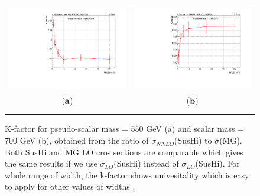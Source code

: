 \begin{figure}[h]
\centering
\begin{tabular}{cc}
\hspace{-0.5cm}
\includegraphics[scale=0.4]{fig/chapt4/k_factor_PScalar_m550_res.pdf}
& \hspace{-0.95cm} \includegraphics[scale=0.4]{fig/chapt4/k_factor_Scalar_m700_res.pdf}\\
($\mathbf{a}$)\qquad\qquad&($\mathbf{b}$)\qquad\qquad\\ \\
\caption{K-factor for pseudo-scalar mass = 550 GeV (a) and scalar mass = 700 GeV (b), obtained from the ratio of $\sigma_{NNLO}$(SusHi) to $\sigma$(MG). Both SusHi and MG LO cros sections are comparable which gives the same results if we use $\sigma_{LO}$(SusHi) instead of $\sigma_{LO}$(SusHi). For whole range of width, the k-factor shows univesitality which is easy to apply for other values of widths \label{fig:k_factor}.}
\end{tabular}
\end{figure}

